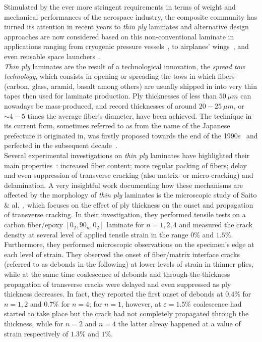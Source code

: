 \documentclass[review]{elsarticle}
\begin{document}
Stimulated by the ever more stringent requirements in terms of weight and mechanical performances of the aerospace industry, the composite community has turned its attention in recent years to \emph{thin ply} laminates and alternative design approaches are now considered based on this non-conventional laminate in applications ranging from cryogenic pressure vessels~\cite{McCarville2018}, to airplanes' wings~\cite{Kim2017}, and even reusable space launchers~\cite{Kopp2017}.\\
\emph{Thin ply} laminates are the result of a technological innovation, the \emph{spread tow technology}, which consists in opening or spreading the tows in which fibers (carbon, glass, aramid, basalt among others) are usually shipped in into very thin tapes then used for laminate production. Ply thicknesses of less than $50\ \mu m$ can nowadays be mass-produced, and record thicknesses of around $20-25\ \mu m$, or $\sim 4-5$ times the average fiber's diameter, have been achieved. The technique in its current form, sometimes referred to as  from the name of the Japanese prefecture it originated in, was firstly proposed towards the end of the 1990s~\cite{Kawabe1997} and perfected in the subsequent decade~\cite{Kawabe2008,Kawabe2008en}.\\
Several experimental investigations on \emph{thin ply} laminates have highlighted their main properties~\cite{Sasayama2003,Tsai2005,Yamaguchi2005,Sihn2007,Yokozeki2008,Yokozeki2010,Moon2011,Arteiro2013,Arteiro2014,Amacher2014,Guillamet2014,Huang2018,Cugnoni2018}: increased fiber content; more regular packing of fibers; delay and even suppression of transverse cracking (also matrix- or micro-cracking) and delamination. A very insightful work documenting how these mechanisms are affected by the morphology of \emph{thin ply} laminates is the microscopic study of Saito \& al.~\cite{Saito2012}, which focuses on the effect of ply thickness on the onset and propagation of transverse cracking. In their investigation, they performed tensile tests on a carbon fiber/epoxy $\left[0_{2},90_{n},0_{2}\right]$ laminate for $n=1,2,4$ and measured the crack density at several level of applied tensile strain in the range $0\%$ and $1.5\%$. Furthermore, they performed microscopic observations on the specimen's edge at each level of strain. They observed the onset of fiber/matrix interface cracks (referred to as debonds in the following) at lower levels of strain in thinner plies, while at the same time coalescence of debonds and through-the-thickness propagation of transverse cracks were delayed and even suppressed as ply thickness decreases. In fact, they reported the first onset of debonds at $0.4\%$ for $n=1,2$ and $0.7\%$ for $n=4$; for $n=1$, however, at $\varepsilon=1.5\%$ coalescence had started to take place but the crack had not completely propagated through the thickness, while for $n=2$ and $n=4$ the latter alreay happened at a value of strain respectively of $1.3\%$ and $1\%$.\\
\end{document}
